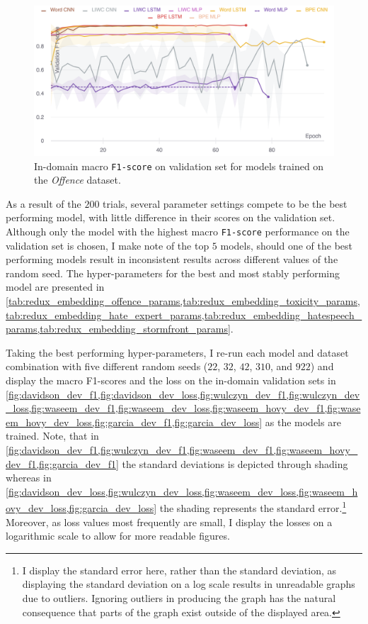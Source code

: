 \begin{figure}
    \centering
    \includegraphics[width=\textwidth]{davidson_dev_f1.pdf}
    \caption{In-domain macro \texttt{F1-score} on validation set for models trained on the \textit{Offence} dataset.}
    \label{fig:davidson_dev_f1}
\end{figure}

As a result of the $200$ trials, several parameter settings compete to be the best performing model, with little difference in their scores on the validation set. Although only the model with the highest macro \texttt{F1-score} performance on the validation set is chosen, I make note of the top $5$ models, should one of the best performing models result in inconsistent results across different values of the random seed. The hyper-parameters for the best and most stably performing model are presented in \cref{tab:redux_embedding_offence_params,tab:redux_embedding_toxicity_params,tab:redux_embedding_hate_expert_params,tab:redux_embedding_hatespeech_params,tab:redux_embedding_stormfront_params}.

Taking the best performing hyper-parameters, I re-run each model and dataset combination with five different random seeds ($22$, $32$, $42$, $310$, and $922$) and display the macro F1-scores and the loss on the in-domain validation sets in \cref{fig:davidson_dev_f1,fig:davidson_dev_loss,fig:wulczyn_dev_f1,fig:wulczyn_dev_loss,fig:waseem_dev_f1,fig:waseem_dev_loss,fig:waseem_hovy_dev_f1,fig:waseem_hovy_dev_loss,fig:garcia_dev_f1,fig:garcia_dev_loss} as the models are trained.
Note, that in \cref{fig:davidson_dev_f1,fig:wulczyn_dev_f1,fig:waseem_dev_f1,fig:waseem_hovy_dev_f1,fig:garcia_dev_f1} the standard deviations is depicted through shading whereas in \cref{fig:davidson_dev_loss,fig:wulczyn_dev_loss,fig:waseem_dev_loss,fig:waseem_hovy_dev_loss,fig:garcia_dev_loss} the shading represents the standard error.\footnote{I display the standard error here, rather than the standard deviation, as displaying the standard deviation on a log scale results in unreadable graphs due to outliers. Ignoring outliers in producing the graph has the natural consequence that parts of the graph exist outside of the displayed area.}
Moreover, as loss values most frequently are small, I display the losses on a  logarithmic scale to allow for more readable figures.\vspace{5mm}


